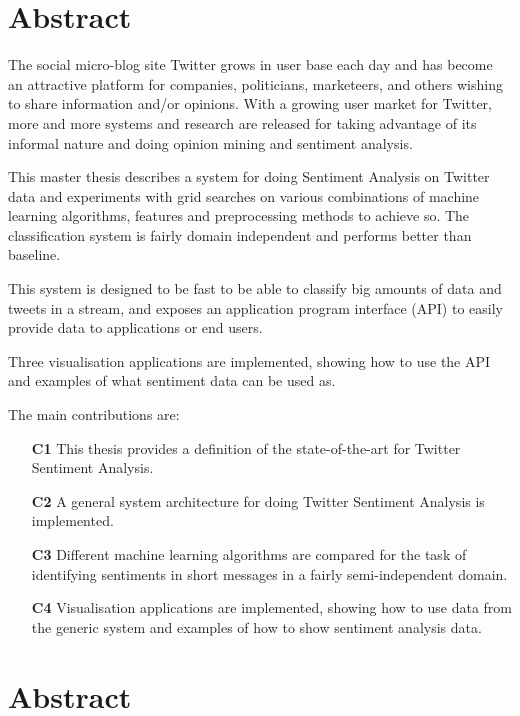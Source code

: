 \section*{Abstract}

The social micro-blog site Twitter grows in user base each day and has become an attractive platform for companies, politicians, marketeers, and others wishing to share information and/or opinions. With a growing user market for Twitter, more and more systems and research are released for taking advantage of its informal nature and doing opinion mining and sentiment analysis. 

This master thesis describes a system for doing Sentiment Analysis on Twitter data and experiments with grid searches on various combinations of machine learning algorithms, features and preprocessing methods to achieve so. The classification system is fairly domain independent and performs better than baseline. 

This system is designed to be fast to be able to classify big amounts of data and tweets in a stream, and exposes an application program interface (API) to easily provide data to applications or end users. 

Three visualisation applications are implemented, showing how to use the API and examples of what sentiment data can be used as.

The main contributions are: 

\begin{itemize}
\item[\textbf{C1}] This thesis provides a definition of the state-of-the-art for Twitter Sentiment Analysis.

\item[\textbf{C2}] A general system architecture for doing Twitter Sentiment Analysis is implemented. 

\item[\textbf{C3}] Different machine learning algorithms are compared for the task of identifying sentiments in short messages in a fairly semi-independent domain.

\item[\textbf{C4}] Visualisation applications are implemented, showing how to use data from the generic system and examples of how to show sentiment analysis data.
\end{itemize}

\clearpage

\section*{Abstract}

